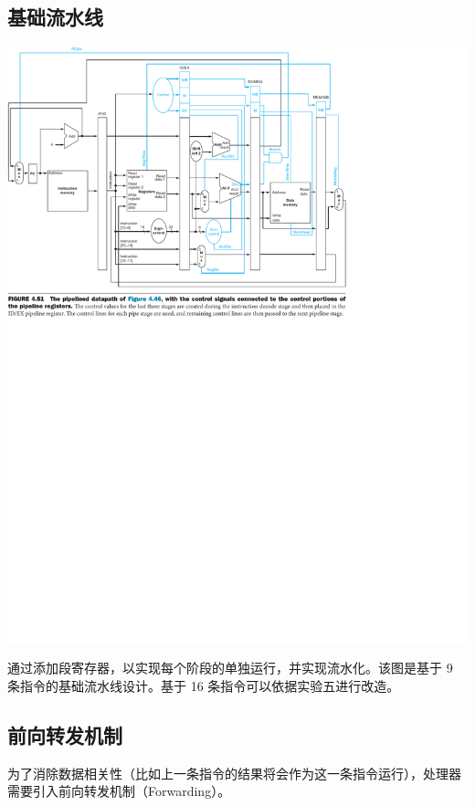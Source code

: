 \documentclass[a4paper,UTF8]{ctexart}
\begin{document}
\subsection{基础流水线}
\includegraphics[width=\textwidth]{pipeline.pdf}

通过添加段寄存器，以实现每个阶段的单独运行，并实现流水化。该图是基于 9 条指令的基础流水线设计。基于 16 条指令可以依据实验五进行改造。

\subsection{前向转发机制}\label{sec:fwd}

为了消除数据相关性（比如上一条指令的结果将会作为这一条指令运行），处理器需要引入前向转发机制（Forwarding）。
\end{document}
